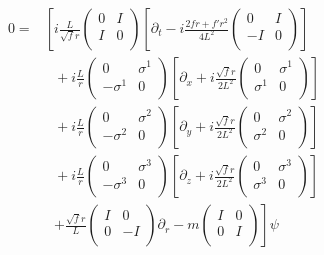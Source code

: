 \begin{align}
   0 =& \left[ i\frac{L}{\sqrt{f}r} \begin{pmatrix} 0 & I \\ I & 0 \\ \end{pmatrix} \left[ \partial_t - i\frac{2fr+f'r^2}{4L^2}\begin{pmatrix} 0 & I \\ -I & 0 \\ \end{pmatrix} \right] \right.\nonumber\\
      & ~~~ + i\frac{L}{r}\begin{pmatrix} 0 & \sigma^1 \\ -\sigma^1 & 0 \\ \end{pmatrix} \left[ \partial_x + i\frac{\sqrt{f}r}{2L^2}\begin{pmatrix} 0 & \sigma^1 \\ \sigma^1 & 0 \\ \end{pmatrix} \right] \nonumber\\
      & ~~~ + i\frac{L}{r}\begin{pmatrix} 0 & \sigma^2 \\ -\sigma^2 & 0 \\ \end{pmatrix} \left[ \partial_y + i\frac{\sqrt{f}r}{2L^2}\begin{pmatrix} 0 & \sigma^2 \\ \sigma^2 & 0 \\ \end{pmatrix} \right] \nonumber\\
      & ~~~ + i\frac{L}{r}\begin{pmatrix} 0 & \sigma^3 \\ -\sigma^3 & 0 \\ \end{pmatrix} \left[ \partial_z + i\frac{\sqrt{f}r}{2L^2}\begin{pmatrix} 0 & \sigma^3 \\ \sigma^3 & 0 \\ \end{pmatrix} \right] \nonumber\\
      & ~~~ \left. + \frac{\sqrt{f}r}{L}\begin{pmatrix} I & 0 \\ 0 & -I \\ \end{pmatrix} \partial_r - m \begin{pmatrix} I & 0 \\ 0 & I \\ \end{pmatrix} \right] \psi
\end{align}

